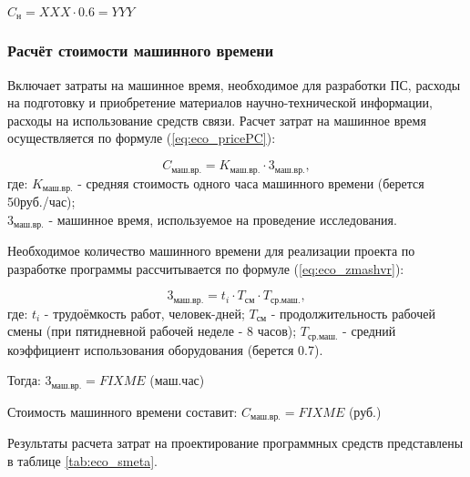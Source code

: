 ${C_{\mbox{н}} = XXX \cdot 0.6 = YYY}$

\subsubsection*{Расчёт стоимости машинного времени}
Включает затраты на машинное время, необходимое для разработки ПС, расходы на подготовку и приобретение материалов
научно-технической информации, расходы на использование средств связи. Расчет затрат на машинное время осуществляется
по формуле (\ref{eq:eco_pricePC}):

\begin{equation}
C_{\mbox{маш.вр.}} = K_{\mbox{маш.вр.}} \cdot 3_{\mbox{маш.вр.}},
\label{eq:eco_pricePC}
\end{equation}
где:	${K_{\mbox{маш.вр.}}}$ - средняя стоимость одного часа машинного времени (берется 50руб./час); \\
	${3_{\mbox{маш.вр.}}}$ - машинное время, используемое на проведение исследования.	

Необходимое количество машинного времени для реализации проекта по разработке программы рассчитывается по формуле (\ref{eq:eco_zmashvr}):

\begin{equation}
3_{\mbox{маш.вр.}} = t_i \cdot T_{\mbox{см}} \cdot T_{\mbox{ср.маш.}},
\label{eq:eco_zmashvr}
\end{equation}
где:	${t_i}$ - трудоёмкость работ, человек-дней;
	${T_{\mbox{см}}}$ - продолжительность рабочей смены (при пятидневной рабочей неделе - 8 часов);
	${T_{\mbox{ср.маш.}}}$ - средний коэффициент использования оборудования (берется 0.7).

Тогда: ${3_{\mbox{маш.вр.}} = FIXME}$ (маш.час)

Стоимость машинного времени составит: ${C_{\mbox{маш.вр.}} = FIXME}$ (руб.)

Результаты расчета затрат на проектирование программных средств представлены в таблице \ref{tab:eco_smeta}.

